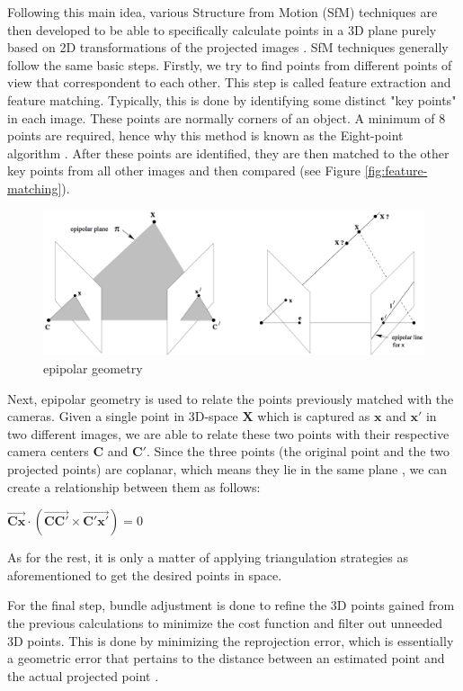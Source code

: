 Following this main idea, various Structure from Motion (SfM) techniques are then developed to be able to specifically calculate points in a 3D plane purely based on 2D transformations of the projected images \parencite{sfm-base}. SfM techniques generally follow the same basic steps. Firstly, we try to find points from different points of view that correspondent to each other. This step is called feature extraction and feature matching. Typically, this is done by identifying some distinct "key points" in each image. These points are normally corners of an object. A minimum of 8 points are required, hence why this method is known as the Eight-point algorithm \parencite{8pointalg}. After these points are identified, they are then matched to the other key points from all other images and then compared (see Figure \ref{fig:feature-matching}).

\begin{figure}[h]
    \centering
    \includegraphics[width=0.5\linewidth]{figures/epipolar_geometry_01.png}
    \caption{epipolar geometry}
    \label{fig:epipolar}
\end{figure}

Next, epipolar geometry is used to relate the points previously matched with the cameras. Given a single point in 3D-space \(\mathbf{X}\) which is captured as \(\mathbf{x}\) and \(\mathbf{x}'\) in two different images, we are able to relate these two points with their respective camera centers \(\mathbf{C}\) and \(\mathbf{C}'\). Since the three points (the original point and the two projected points) are coplanar, which means they lie in the same plane \parencite{coplanar}, we can create a relationship between them as follows:

\begin{center}
    \(\Vec{\mathbf{Cx}} \cdot (\Vec{\mathbf{CC'}} \times \Vec{\mathbf{C'x'}}) = 0\)
\end{center}

As for the rest, it is only a matter of applying triangulation strategies as aforementioned to get the desired points in space.

For the final step, bundle adjustment \parencite{bundle-adj} is done to refine the 3D points gained from the previous calculations to minimize the cost function and filter out unneeded 3D points. This is done by minimizing the reprojection error, which is essentially a geometric error that pertains to the distance between an estimated point and the actual projected point \parencite{epipolar}.

